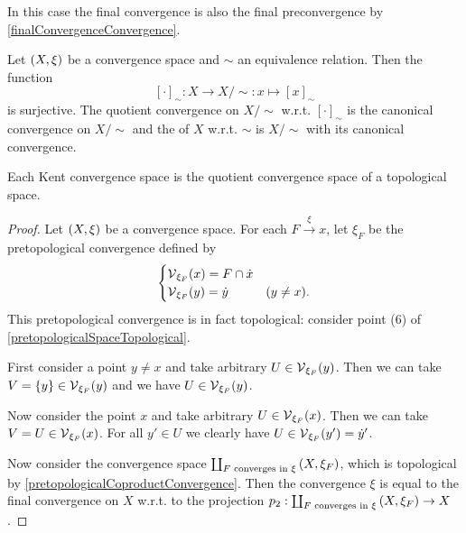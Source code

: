 In this case the final convergence is also the final preconvergence by \ref{finalConvergenceConvergence}.

\begin{example}
Let $\sSet{X,\xi}$ be a convergence space and $\sim$ an equivalence relation. Then the function
\[ [\cdot]_\sim: X\to X/{\sim}: x\mapsto [x]_\sim \]
is surjective. The quotient convergence on $X/{\sim}$ w.r.t. $[\cdot]_\sim$ is the canonical convergence on $X/{\sim}$ and the  of $X$ w.r.t. $\sim$ is $X/{\sim}$ with its canonical convergence.
\end{example}

\begin{proposition} \label{convergenceSpaceQuotientOfTopologicalSpace}
Each Kent convergence space is the quotient convergence space of a topological space.
\end{proposition}
\begin{proof}
Let $\sSet{X,\xi}$ be a convergence space. For each $F\overset{\xi}{\longrightarrow} x$, let $\xi_F$ be the pretopological convergence defined by
\[ \begin{cases}
\operatorname{\mathcal{V}}_{\xi_F}(x) = F \cap \dot{x}  \\
\operatorname{\mathcal{V}}_{\xi_F}(y) = \dot{y} & (y \neq x).
\end{cases} \]
This pretopological convergence is in fact topological: consider point (6) of \ref{pretopologicalSpaceTopological}.

First consider a point $y\neq x$ and take arbitrary $U\in \operatorname{\mathcal{V}}_{\xi_F}(y)$. Then we can take $V = \{y\} \in \operatorname{\mathcal{V}}_{\xi_F}(y)$ and we have $U\in \operatorname{\mathcal{V}}_{\xi_F}(y)$.

Now consider the point $x$ and take arbitrary $U\in \operatorname{\mathcal{V}}_{\xi_F}(x)$. Then we can take $V = U \in \operatorname{\mathcal{V}}_{\xi_F}(x)$. For all $y'\in U$ we clearly have $U\in \operatorname{\mathcal{V}}_{\xi_F}(y') = \dot{y}'$.

Now consider the convergence space $\coprod_{\text{$F$ converges in $\xi$}}\sSet{X, \xi_F}$, which is topological by \ref{pretopologicalCoproductConvergence}. Then the convergence $\xi$ is equal to the final convergence on $X$ w.r.t. to the projection $p_2: \coprod_{\text{$F$ converges in $\xi$}}\sSet{X, \xi_F} \to X$.
\end{proof}


